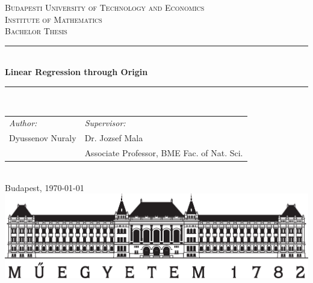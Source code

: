 \documentclass[12pt,a4paper,oneside]{book} %
\newcommand\HRule{\rule{\textwidth}{1pt}}
\begin{document}
\onehalfspacing

\begin{titlepage}
	
	
	\center %
	
	
	\textsc{\LARGE Budapesti University of Technology and Economics}\\[1.5cm] %
	\textsc{\Large Institute of Mathematics}\\[0.5cm] %
	\textsc{\large Bachelor Thesis}\\[0.5cm] %
	
	
	\HRule \\[0.4cm]
	{ \Large \bfseries Linear Regression through Origin
		 }\\[0.4cm]
	\HRule \\[1.5cm]
	
	
	\begin{tabular}{L{6cm} R{8cm}}
	\emph{Author:}   & \emph{Supervisor:} \\
	Dyussenov Nuraly & Dr. Jozsef Mala   \\
	                 & Associate Professor, BME Fac. of Nat. Sci. 
	\end{tabular}\\[1.3cm]

	
	\vfill
	{\Large Budapest, \today}\\[1.2cm] %
		
	\includegraphics[trim={0cm 0cm 0cm 0cm},clip,width=0.5\linewidth]{bme_logo_nagy.eps}
	
	
\end{titlepage}
\end{document}

